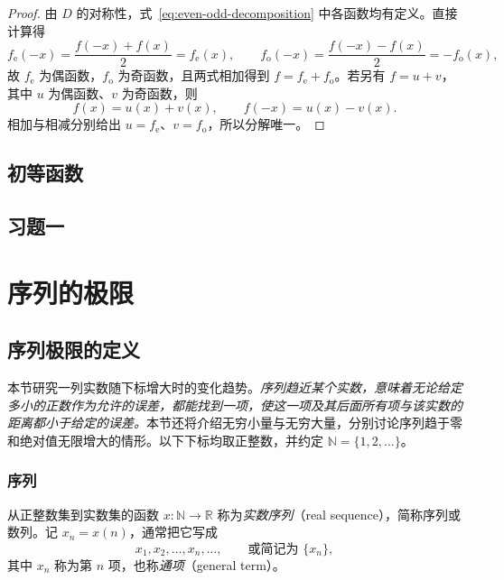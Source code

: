 \documentclass[UTF8,12pt,a4paper,fontset=fandol]{ctexbook}
\begin{document}
\begin{proof}
由 $D$ 的对称性，式~\eqref{eq:even-odd-decomposition} 中各函数均有定义。直接计算得
\[
    f_{\mathrm e}(-x)=\frac{f(-x)+f(x)}{2}=f_{\mathrm e}(x),
    \qquad
    f_{\mathrm o}(-x)=\frac{f(-x)-f(x)}{2}=-f_{\mathrm o}(x),
\]
故 $f_{\mathrm e}$ 为偶函数，$f_{\mathrm o}$ 为奇函数，且两式相加得到 $f=f_{\mathrm e}+f_{\mathrm o}$。若另有 $f=u+v$，其中 $u$ 为偶函数、$v$ 为奇函数，则
\[
    f(x)=u(x)+v(x),\qquad f(-x)=u(x)-v(x).
\]
相加与相减分别给出 $u=f_{\mathrm e}$、$v=f_{\mathrm o}$，所以分解唯一。
\end{proof}

\section{初等函数}
\label{sec:elementary-functions}

\section*{习题一}

\chapter{序列的极限}
\label{chap:sequence-limits}

\section{序列极限的定义}
\label{sec:definition-of-sequence-limits}

本节研究一列实数随下标增大时的变化趋势。\emph{序列趋近某个实数，意味着无论给定多小的正数作为允许的误差，都能找到一项，使这一项及其后面所有项与该实数的距离都小于给定的误差。}本节还将介绍无穷小量与无穷大量，分别讨论序列趋于零和绝对值无限增大的情形。以下下标均取正整数，并约定 $\mathbb{N}=\{1,2,\ldots\}$。

\subsection{序列}
\label{subsec:sequences}

\begin{definition}
\label{def:real-sequence}
从正整数集到实数集的函数 $x:\mathbb{N}\to\mathbb{R}$ 称为\emph{实数序列}（real sequence），简称序列或数列。记 $x_n=x(n)$，通常把它写成
\[
    x_1,x_2,\ldots,x_n,\ldots,
    \qquad\text{或简记为 }\{x_n\},
\]
其中 $x_n$ 称为第 $n$ 项，也称\emph{通项}（general term）。
\end{definition}
\end{document}
